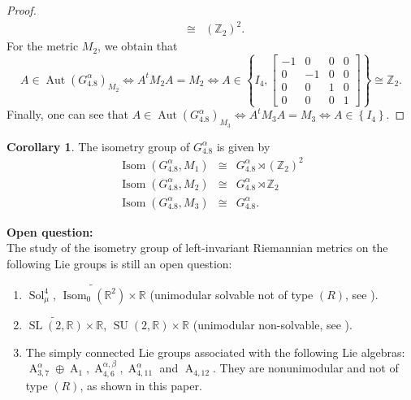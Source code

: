 \documentclass[12pt,a4paper,twoside]{article}
\theoremstyle{definition}
\newtheorem{corollary}[theorem]{Corollary}
\begin{document}
\begin{proof}
\begin{eqnarray*}
&\cong& (\mathbb{Z}_2)^2.
\end{eqnarray*}
For the metric $M_2$, we obtain that
$$A \in \operatorname{Aut}\left(G_{4.8}^{\alpha}\right)_{M_2} \Leftrightarrow A^tM_2A = M_2 \Leftrightarrow A \in \left\lbrace I_4, \begin{bmatrix}
-1 & 0 & 0 & 0\\
0 & -1 & 0 & 0\\
0 & 0 & 1 & 0\\
0 & 0 & 0 & 1
\end{bmatrix} \right\rbrace \cong \mathbb{Z}_2.$$
Finally, one can see that $A \in \operatorname{Aut}\left(G_{4.8}^{\alpha}\right)_{M_3} \Leftrightarrow A^tM_3A = M_3 \Leftrightarrow A \in \left\lbrace I_4 \right\rbrace.$
\end{proof}
\begin{corollary}
The isometry group of $G_{4.8}^{\alpha}$ is given by
\begin{eqnarray*}
\operatorname{Isom}\left(G_{4.8}^{\alpha}, M_1\right)  &\cong& G_{4.8}^{\alpha} \rtimes (\mathbb{Z}_2)^2\\
\operatorname{Isom}\left(G_{4.8}^{\alpha}, M_2\right)  &\cong& G_{4.8}^{\alpha} \rtimes \mathbb{Z}_2\\
\operatorname{Isom}\left(G_{4.8}^{\alpha}, M_3\right)  &\cong& G_{4.8}^{\alpha}.
\end{eqnarray*}
\end{corollary}
\textbf{Open question:}\\
The study of the isometry group of left-invariant Riemannian metrics on the following Lie groups is still an open question:
\begin{enumerate}
\item $\operatorname{Sol}_{\mu}^4$, $\widetilde{\operatorname{Isom}_0(\mathbb{R}^2)} \times \mathbb{R}$ (unimodular solvable not of type $(R)$, see \cite{van2017metrics}).
\item $\widetilde{\operatorname{SL}(2,\mathbb{R})} \times \mathbb{R}$, $\operatorname{SU}(2, \mathbb{R}) \times \mathbb{R}$ (unimodular non-solvable, see \cite{van2017metrics}).
\item The simply connected Lie groups associated with the following Lie algebras:\\ $\operatorname{A}_{3, 7}^{\alpha} \oplus \operatorname{A}_1, \operatorname{A}_{4, 6}^{\alpha, \beta}, \operatorname{A}_{4, 11}^{\alpha}$ and $\operatorname{A}_{4, 12}$. They are nonunimodular and not of type $(R)$, as shown in this paper.
\end{enumerate}
\end{document}
